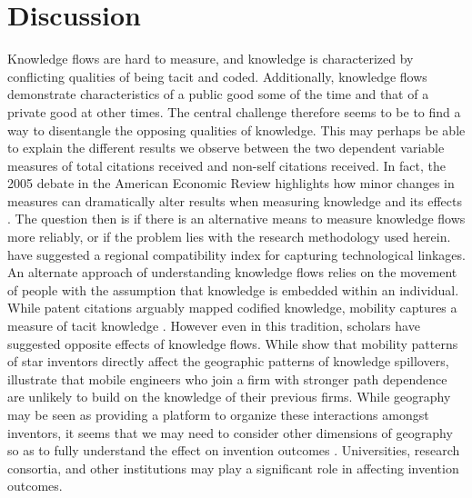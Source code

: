 \documentclass[12pt,letterpaper]{article}
\begin{document}
\section*{Discussion}
Knowledge flows are hard to measure, and knowledge is characterized by conflicting qualities of being tacit and coded. Additionally, knowledge flows demonstrate characteristics of a public good some of the time and that of a private good at other times. The central challenge therefore seems to be to find a way to disentangle the opposing qualities of knowledge. This may perhaps be able to explain the different results we observe between the two dependent variable measures of total citations received and non-self citations received. In fact, the 2005 debate in the American Economic Review highlights how minor changes in measures can dramatically alter results when measuring knowledge and its effects \citep*{Henderson2005, Thompson2005}. The question then is if there is an alternative means to measure knowledge flows more reliably, or if the problem lies with the research methodology used herein. \cite{Maurseth2002} have suggested a regional compatibility index for capturing technological linkages. An alternate approach of understanding knowledge flows relies on the movement of people with the assumption that knowledge is embedded within an individual. While patent citations arguably mapped codified knowledge, mobility captures a measure of tacit knowledge \citep{Polanyi1958}. However even in this tradition, scholars have suggested opposite effects of knowledge flows. While \cite{Almeida1997} show that mobility patterns of star inventors directly affect the geographic patterns of knowledge spillovers, \cite{Song2003} illustrate that mobile engineers who join a firm with stronger path dependence are unlikely to build on the knowledge of their previous firms. While geography may be seen as providing a platform to organize these interactions amongst inventors, it seems that we may need to consider other dimensions of geography so as to fully understand the effect on invention outcomes \citep{Bunnell2001}. Universities, research consortia, and other institutions may play a significant role in affecting invention outcomes.
\end{document}
